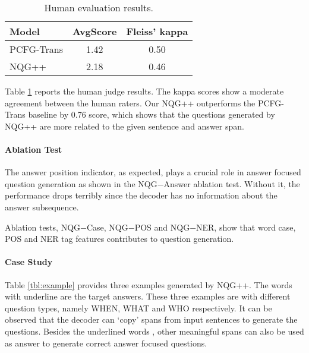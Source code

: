 \documentclass[11pt,letterpaper]{article}
\newcommand{\ourModelName}{NQG}
\begin{document}
\begin{table}[htbp]
	\small
	\begin{center}
		\begin{tabular}{lcc}
			\toprule
			\textbf{Model} &  AvgScore & Fleiss' kappa  \\
			\midrule
			PCFG-Trans & 1.42 & 0.50 \\
			\ourModelName{}++ & 2.18 & 0.46  \\
			\bottomrule
		\end{tabular}
	\end{center}
	\caption{\label{tbl:humanEva} Human evaluation results.}
\end{table}

Table \ref{tbl:humanEva} reports the human judge results.
The kappa scores show a moderate agreement between the human raters.
Our \ourModelName{}++ outperforms the PCFG-Trans baseline by 0.76 score, which shows that the questions generated by \ourModelName{}++ are more related to the given sentence and answer span.

\paragraph{Ablation Test}
The answer position indicator, as expected, plays a crucial role in answer focused question generation as shown in the \ourModelName{}$ - $Answer ablation test.
Without it, the performance drops terribly since the decoder has no information about the answer subsequence.

Ablation tests, \ourModelName{}$ - $Case, \ourModelName{}$ - $POS and \ourModelName{}$ - $NER,  show that word case, POS and NER tag features contributes to question generation.


\paragraph{Case Study}
Table \ref{tbl:example} provides three examples generated by \ourModelName{}++.
The words with underline are the target answers.
These three examples are with different question types, namely WHEN, WHAT and WHO respectively.
It can be observed that the decoder can `copy' spans from input sentences to generate the questions.
Besides the underlined words , other meaningful spans can also be used as answer to generate correct answer focused questions.
\end{document}
